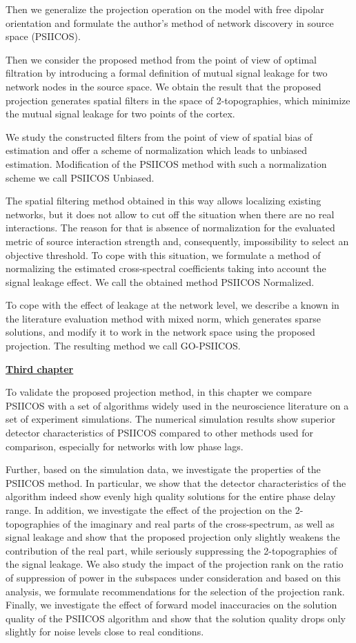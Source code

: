 Then we generalize the projection operation on the model with free dipolar
orientation and formulate the author's method of network discovery in source
space (PSIICOS).

Then we consider the proposed method from the point of view of optimal
filtration by introducing a formal definition of mutual signal leakage for two
network nodes in the source space.  We obtain the result that the proposed
projection generates spatial filters in the space of 2-topographies, which
minimize the mutual signal leakage for two points of the cortex.

We study the constructed filters from the point of view of spatial bias of
estimation and offer a scheme of normalization which leads to unbiased
estimation.  Modification of the PSIICOS method with such a normalization
scheme we call PSIICOS Unbiased.

The spatial filtering method obtained in this way allows localizing existing
networks, but it does not allow to cut off the situation when there are no real
interactions. The reason for that is absence of normalization for the evaluated
metric of source interaction strength and, consequently, impossibility to
select an objective threshold.  To cope with this situation, we formulate a
method of normalizing the estimated cross-spectral coefficients taking into
account the signal leakage effect. We call the obtained method PSIICOS
Normalized.


To cope with the effect of leakage at the network level, we describe a known in
the literature evaluation method with mixed norm, which generates sparse
solutions, and modify it to work in the network space using the proposed
projection. The resulting method we call GO-PSIICOS.


\underline{\textbf{Third chapter}}

To validate the proposed projection method, in this chapter we compare PSIICOS
with a set of algorithms widely used in the neuroscience literature on a set of
experiment simulations.  The numerical simulation results show superior
detector characteristics of PSIICOS compared to other methods used for
comparison, especially for networks with low phase lags.

Further, based on the simulation data, we investigate the properties of the
PSIICOS method. \@ In particular, we show that the detector characteristics of
the algorithm indeed show evenly high quality solutions for the entire phase
delay range. In addition, we investigate the effect of the projection on the
2-topographies of the imaginary and real parts of the cross-spectrum, as well
as signal leakage and show that the proposed projection only slightly weakens
the contribution of the real part, while seriously suppressing the
2-topographies of the signal leakage. We also study the impact of the
projection rank on the ratio of suppression of power in the subspaces under
consideration and based on this analysis, we formulate recommendations for the
selection of the projection rank.  Finally, we investigate the effect of
forward model inaccuracies on the solution quality of the PSIICOS algorithm and
show that the solution quality drops only slightly for noise levels close to
real conditions.

